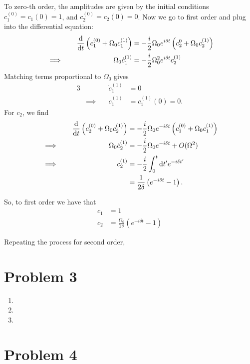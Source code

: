 \documentclass[12pt]{article}
\begin{document}
To zero-th order, the amplitudes are given by the initial conditions $c_1^{(0)} = c_1(0) = 1$, and $c_2^{(0)} = c_2(0) = 0$. Now we go to first order and plug into the differential equation:
\begin{alignat*}{3}
    &\quad & \dv{t}\left(c_1^{(0)} + \Omega_0c_1^{(1)}\right) &= -\frac{i}{2}\Omega_0e^{i\delta t}\left(c_2^{0} + \Omega_0c_2^{(1)}\right) \\
    &\implies\quad & \Omega_0\dot{c}_1^{(1)} &= -\frac{i}{2}\Omega_0^2e^{i\delta t}c_2^{(1)}
\end{alignat*}
Matching terms proportional to $\Omega_0$ gives
\begin{alignat*}{3}
    &\quad & \dot{c}_1^{(1)} &= 0 \\
    &\implies\quad & c_1^{(1)} &= c_1^{(1)}(0) = 0.
\end{alignat*}
For $c_2$, we find
\begin{alignat*}{3}
    &\quad & \dv{t}\left(c_2^{(0)} + \Omega_0c_2^{(1)}\right) &= -\frac{i}{2}\Omega_0e^{-i\delta t}\left(c_1^{(0)} + \Omega_0c_1^{(1)}\right) \\
    &\implies\quad & \Omega_0\dot{c}_2^{(1)} &= -\frac{i}{2}\Omega_0e^{-i\delta t} + O(\Omega^2) \\
    &\implies\quad & c_2^{(1)} &= -\frac{i}{2}\int_0^t\dd t' e^{-i\delta t'} \\
    & & &= \frac{1}{2\delta}\left(e^{-i\delta t} - 1\right).
\end{alignat*}

So, to first order we have that
\begin{align}
    c_1 &= 1 \\
    c_2 &= \frac{\Omega_0}{2\delta}\left(e^{-i\delta t} - 1\right)
\end{align}

Repeating the process for second order,


\section*{Problem 3}
\begin{enumerate}[label=(\alph*)]
    \item 
    \item 
    \item
\end{enumerate}

\section*{Problem 4}


\end{document}

